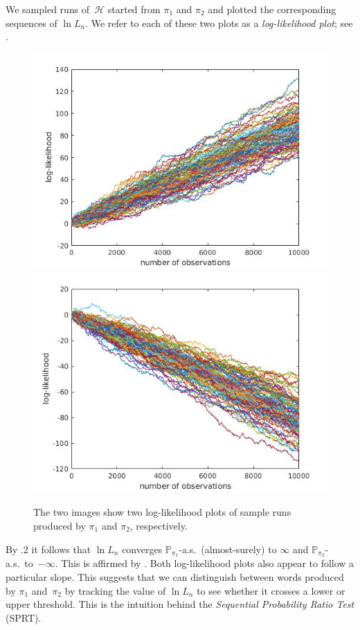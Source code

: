 \documentclass[a4paper,UKenglish,cleveref, autoref,mathscr]{lipics-v2019}
\newcommand{\PP}{\mathbb{P}}
\newcommand{\1}{\mathbbm{1}}
\renewcommand{\H}{\mathcal{H}}
\begin{document}
\begin{example}
We sampled runs of~$\H$ started from $\pi_1$ and $\pi_2$ and plotted the corresponding sequences of $\ln L_n$.
We refer to each of these two plots as a \emph{log-likelihood plot}; see .
\begin{center}
	\begin{figure}[ht]
		\includegraphics[width=\textwidth/2]{loglikepositiveruns100000_100.jpg}	
		\includegraphics[width=\textwidth/2]{loglikenegativeruns100000_100.jpg}
		\caption{The two images show two log-likelihood plots of sample runs produced by $\pi_1$ and $\pi_2$, respectively.}\label{loglikes}
	\end{figure}
\end{center}
By .2 it follows that $\ln L_n$ converges $\PP_{\pi_1}$-a.s.\ (almost-surely) to $\infty$ and $\PP_{\pi_2}$-a.s.\ to~$-\infty$.
This is affirmed by .
Both log-likelihood plots also appear to follow a particular slope.
This suggests that we can distinguish between words produced by $\pi_1$ and~$\pi_2$ by tracking the value of $\ln L_n$ to see whether it crosses a lower or upper threshold.
This is the intuition behind the \emph{Sequential Probability Ratio Test} (SPRT).
\end{example}
\end{document}
